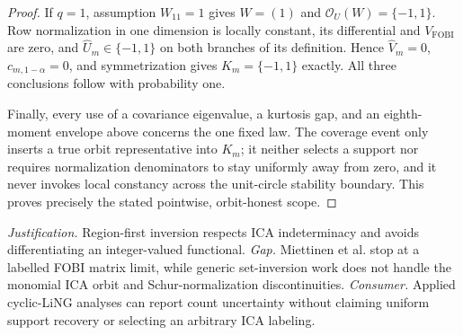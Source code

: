 \documentclass{article}
\begin{document}
\begin{proof}
If \(q=1\), assumption \(W_{11}=1\) gives \(W=(1)\) and \(\mathcal O_U(W)=\{-1,1\}\). Row normalization in one dimension is locally constant, its differential and \(V_{\mathrm{FOBI}}\) are zero, and \(\widehat U_m\in\{-1,1\}\) on both branches of its definition. Hence \(\widehat V_m=0\), \(c_{m,1-\alpha}=0\), and symmetrization gives \(K_m=\{-1,1\}\) exactly. All three conclusions follow with probability one.

Finally, every use of a covariance eigenvalue, a kurtosis gap, and an eighth-moment envelope above concerns the one fixed law. The coverage event only inserts a true orbit representative into \(K_m\); it neither selects a support nor requires normalization denominators to stay uniformly away from zero, and it never invokes local constancy across the unit-circle stability boundary. This proves precisely the stated pointwise, orbit-honest scope.
\end{proof}
\par\smallskip\noindent \textit{Justification.} Region-first inversion respects ICA indeterminacy and avoids differentiating an integer-valued functional. \textit{Gap.} Miettinen et al. stop at a labelled FOBI matrix limit, while generic set-inversion work does not handle the monomial ICA orbit and Schur-normalization discontinuities. \textit{Consumer.} Applied cyclic-LiNG analyses can report count uncertainty without claiming uniform support recovery or selecting an arbitrary ICA labeling.
\end{document}
